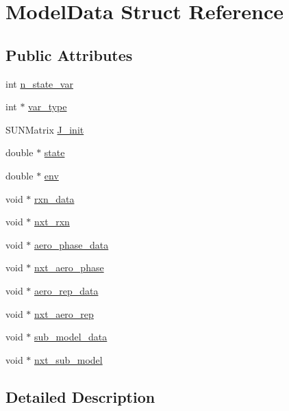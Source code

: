 \hypertarget{struct_model_data}{}\section{Model\+Data Struct Reference}
\label{struct_model_data}
\subsection*{Public Attributes}
\begin{DoxyCompactItemize}
\item 
int \mbox{\hyperlink{struct_model_data_a14ae04e88869b7eccbb6b6cbd4986fe4}{n\+\_\+state\+\_\+var}}
\item 
int $\ast$ \mbox{\hyperlink{struct_model_data_a24ff4cb5a71b0302982382a3f1ac7c0c}{var\+\_\+type}}
\item 
S\+U\+N\+Matrix \mbox{\hyperlink{struct_model_data_a89cc7937767ad9de945f9e8c1d673297}{J\+\_\+init}}
\item 
double $\ast$ \mbox{\hyperlink{struct_model_data_ada6db5b1ae519eeea468f338b6c7e45c}{state}}
\item 
double $\ast$ \mbox{\hyperlink{struct_model_data_ace34c8b909415f6dbcec6790b870897e}{env}}
\item 
void $\ast$ \mbox{\hyperlink{struct_model_data_a1834b37e277cbe0bc44e7d4fe8ea06f2}{rxn\+\_\+data}}
\item 
void $\ast$ \mbox{\hyperlink{struct_model_data_af616e199f72ada969103693b8ee2e055}{nxt\+\_\+rxn}}
\item 
void $\ast$ \mbox{\hyperlink{struct_model_data_aacee51d4b19e9ac0521692b5e29236be}{aero\+\_\+phase\+\_\+data}}
\item 
void $\ast$ \mbox{\hyperlink{struct_model_data_affe4c4f59effcf032b4152736b1e983c}{nxt\+\_\+aero\+\_\+phase}}
\item 
void $\ast$ \mbox{\hyperlink{struct_model_data_ae5546e06565ef797ab94c6278cce0d51}{aero\+\_\+rep\+\_\+data}}
\item 
void $\ast$ \mbox{\hyperlink{struct_model_data_ad7023ba321072b9fde3366a053b32684}{nxt\+\_\+aero\+\_\+rep}}
\item 
void $\ast$ \mbox{\hyperlink{struct_model_data_aca07574f72ee4e6ccc97054b31fed5de}{sub\+\_\+model\+\_\+data}}
\item 
void $\ast$ \mbox{\hyperlink{struct_model_data_a696a2de87563d11b354f981992fa41cd}{nxt\+\_\+sub\+\_\+model}}
\end{DoxyCompactItemize}


\subsection{Detailed Description}


